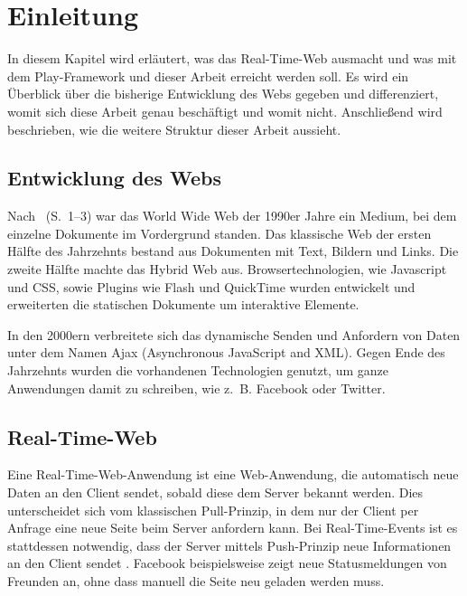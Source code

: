 
\chapter{Einleitung} %
\label{cha:einleitung}

In diesem Kapitel wird erläutert, was das Real-Time-Web ausmacht und was mit dem Play-Framework und dieser Arbeit erreicht werden soll.
Es wird ein Überblick über die bisherige Entwicklung des Webs gegeben und differenziert, womit sich diese Arbeit genau beschäftigt und womit nicht.
Anschließend wird beschrieben, wie die weitere Struktur dieser Arbeit aussieht.


\section{Entwicklung des Webs} %
\label{sec:entwicklung_des_webs}

Nach \citealt{evolution_of_the_web}~(S.~1--3) war das World Wide Web der 1990er Jahre ein Medium, bei dem einzelne Dokumente im Vordergrund standen.
Das klassische Web der ersten Hälfte des Jahrzehnts bestand aus Dokumenten mit Text, Bildern und Links.
Die zweite Hälfte machte das Hybrid Web aus.
Browsertechnologien, wie Javascript und CSS, sowie Plugins wie Flash und QuickTime wurden entwickelt und erweiterten die statischen Dokumente um interaktive Elemente.

In den 2000ern verbreitete sich das dynamische Senden und Anfordern von Daten unter dem Namen Ajax (Asynchronous JavaScript and XML).
Gegen Ende des Jahrzehnts wurden die vorhandenen Technologien genutzt, um ganze Anwendungen damit zu schreiben, wie z.~B. Facebook oder Twitter.



\section{Real-Time-Web} %
\label{sec:real-time-web}

Eine Real-Time-Web-Anwendung ist eine Web-Anwendung, die automatisch neue Daten an den Client sendet, sobald diese dem Server bekannt werden.
Dies unterscheidet sich vom klassischen Pull-Prinzip, in dem nur der Client per Anfrage eine neue Seite beim Server anfordern kann.
Bei Real-Time-Events ist es stattdessen notwendig, dass der Server mittels Push-Prinzip neue Informationen an den Client sendet \cite[vgl.][S.~1]{real_time_web}.
Facebook beispielsweise zeigt neue Statusmeldungen von Freunden an, ohne dass manuell die Seite neu geladen werden muss.

